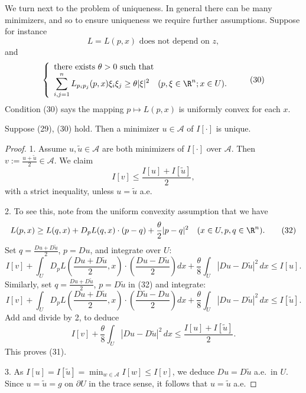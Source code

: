 We turn next to the problem of uniqueness. In general there can be many minimizers, and so to ensure uniqueness we require further assumptions. Suppose for instance
\[
L = L(p,x) \text{ does not depend on } z,
\tag{29}
\]
and
\[
\left\{ \begin{array}{l} \text{there exists } \theta > 0 \text{ such that} \\ \displaystyle \sum_{i,j=1}^n L_{p_i p_j}(p,x) \xi_i \xi_j \geq \theta|\xi|^2 \quad (p, \xi \in \R^n; x \in U). \end{array} \right.
\tag{30}
\]
Condition (30) says the mapping $p \mapsto L(p,x)$ is uniformly convex for each $x$.

\begin{theorem}
\label{thm:uniqueness-minimizer-uniformly-convex}
Suppose (29), (30) hold. Then a minimizer $u \in \mathcal{A}$ of $I[\cdot]$ is unique.
\end{theorem}
\begin{proof}
1. Assume $u, \tilde{u} \in \mathcal{A}$ are both minimizers of $I[\cdot]$ over $\mathcal{A}$. Then $v := \frac{u + \tilde{u}}{2} \in \mathcal{A}$. We claim
\[
I[v] \leq \frac{I[u] + I[\tilde{u}]}{2},
\tag{31}
\]
with a strict inequality, unless $u = \tilde{u}$ a.e.

2. To see this, note from the uniform convexity assumption that we have
\[
L(p,x) \geq L(q,x) + D_p L(q,x) \cdot (p-q) + \frac{\theta}{2}|p-q|^2 \quad (x \in U, p, q \in \R^n).
\tag{32}
\]
Set $q = \frac{Du + D\tilde u}{2}$, $p = Du$, and integrate over $U$:
\[
I[v] + \int_U D_p L\left(\frac{Du+D\tilde u}{2},x\right)\cdot\left(\frac{Du - D\tilde u}{2}\right) dx + \frac{\theta}{8}\int_U |Du - D\tilde u|^2\, dx \le I[u].
\tag{33}
\]
Similarly, set $q = \frac{Du+D\tilde u}{2}$, $p = D\tilde u$ in (32) and integrate:
\[
I[v] + \int_U D_p L\left(\frac{Du+D\tilde u}{2},x\right)\cdot\left(\frac{D\tilde u - Du}{2}\right) dx + \frac{\theta}{8}\int_U |Du - D\tilde u|^2\, dx \le I[\tilde u].
\tag{34}
\]
Add and divide by 2, to deduce
\[
I[v] + \frac{\theta}{8}\int_U |Du - D\tilde u|^2\, dx \le \frac{I[u]+I[\tilde u]}{2}.
\]
This proves (31).

3. As $I[u] = I[\tilde u] = \min_{w\in\mathcal{A}} I[w] \le I[v]$, we deduce $Du = D\tilde u$ a.e.\ in $U$. Since $u = \tilde u = g$ on $\partial U$ in the trace sense, it follows that $u = \tilde u$ a.e.
\end{proof}

